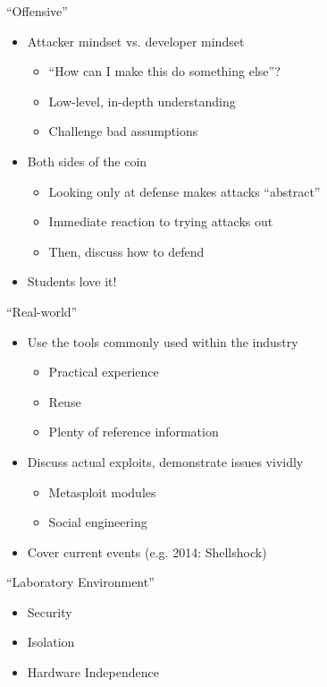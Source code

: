 \documentclass{beamer}
\begin{document}
	\begin{frame}{``Offensive''}
		\begin{itemize}
			\item Attacker mindset vs. developer mindset
			\begin{itemize}
				\item ``How can I make this do something else''?
				\item Low-level, in-depth understanding
				\item Challenge bad assumptions
			\end{itemize}
			\vfill
			\item Both sides of the coin
			\begin{itemize}			
				\item Looking only at defense makes attacks ``abstract''
				\item Immediate reaction to trying attacks out
				\item Then, discuss how to defend
			\end{itemize}		
			\vfill		
			\item Students love it!
		\end{itemize}
	\end{frame}

	\begin{frame}{``Real-world''}
		\begin{itemize}
			\item Use the tools commonly used within the industry	
			\begin{itemize}			
				\item Practical experience
				\item Reuse
				\item Plenty of reference information
			\end{itemize}				
			\item Discuss actual exploits, demonstrate issues vividly
			\begin{itemize}
				\item Metasploit modules
				\item Social engineering
			\end{itemize}
			\item Cover current events (e.g. 2014: Shellshock)
		\end{itemize}		
	\end{frame}

	\begin{frame}{``Laboratory Environment''}
		\begin{itemize}
			\item Security
			\item Isolation
			\item Hardware Independence
		\end{itemize}			
	\end{frame}
\end{document}
